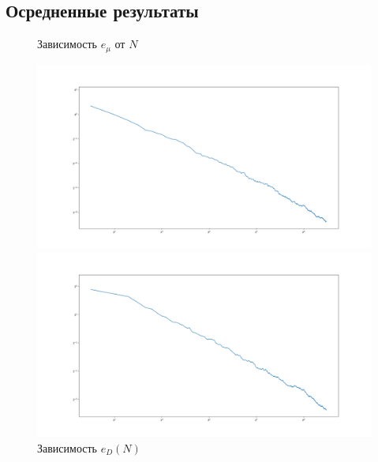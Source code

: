 \documentclass[a4paper,12pt,answers,noaddpoints]{exam}
\begin{document}
\subsection{Осредненные результаты}
\begin{figure}[h!]
\centering
\begin{minipage}[h!]{1.1\linewidth}
    \caption{Зависимость $e_{\mu}$ от $N$}
\includegraphics[width=1\linewidth]{../pngs/mean_errors_approx.png}
\end{minipage}
\vfill
\begin{minipage}[h!]{1.1\linewidth}
    \caption{Зависимость $e_{D}(N)$}
\includegraphics[width=1\linewidth]{../pngs/disp_errors_approx.png}
\end{minipage}
\end{figure}

\pagebreak
\tableofcontents
\hfill
\end{document}
